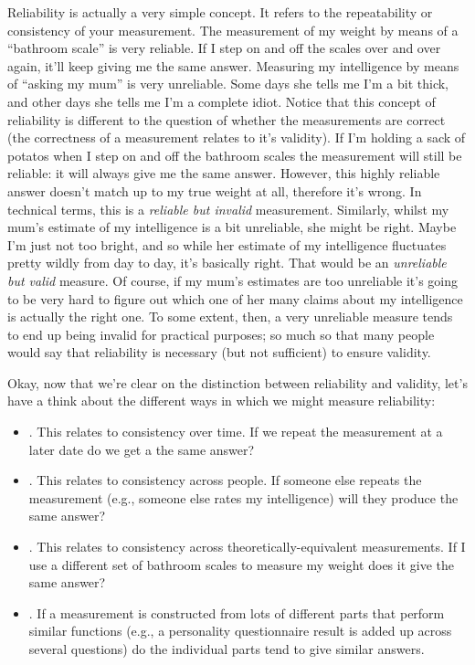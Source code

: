 Reliability is actually a very simple concept. It refers to the repeatability or consistency of your measurement. The measurement of my weight by means of a ``bathroom scale'' is very reliable. If I step on and off the scales over and over again, it'll keep giving me the same answer. Measuring my intelligence by means of ``asking my mum'' is very unreliable. Some days she tells me I'm a bit thick, and other days she tells me I'm a complete idiot. Notice that this concept of reliability is different to the question of whether the measurements are correct (the correctness of a measurement relates to it's validity). If I'm holding a sack of potatos when I step on and off the bathroom scales the measurement will still be reliable: it will always give me the same answer. However, this highly reliable answer doesn't match up to my true weight at all, therefore it's wrong. In technical terms, this is a {\it reliable but invalid} measurement. Similarly, whilst my mum's estimate of my intelligence is a bit unreliable, she might be right. Maybe I'm just not too bright, and so while her estimate of my intelligence fluctuates pretty wildly from day to day, it's basically right. That would be an {\it unreliable but valid} measure. Of course, if my mum's estimates are too unreliable it's going to be very hard to figure out which one of her many claims about my intelligence is actually the right one. To some extent, then, a very unreliable measure tends to end up being invalid for practical purposes; so much so that many people would say that reliability is necessary (but not sufficient) to ensure validity. 

Okay, now that we're clear on the distinction between reliability and validity, let's have a think about the different ways in which we might measure reliability:

\begin{itemize}
\item {}. This relates to consistency over time. If we repeat the measurement at a later date do we get a the same answer?
\item {}. This relates to consistency across people. If someone else repeats the measurement (e.g., someone else rates my intelligence) will they produce the same answer?
\item {}. This relates to consistency across theoretically-equivalent measurements. If I use a different set of bathroom scales to measure my weight does it give the same answer?
\item {}. If a measurement is constructed from lots of different parts that perform similar functions (e.g., a personality questionnaire result is added up across several questions) do the individual parts tend to give similar answers.
\end{itemize}

